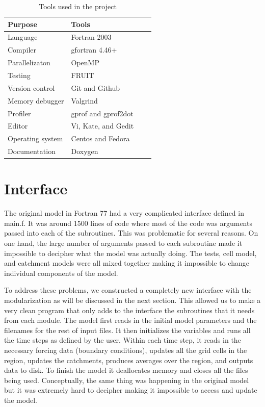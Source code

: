\documentclass[pdftex,12pt,a4paper]{article}
\begin{document}
\begin{table}[ht]
  \begin{center}
    \caption{Tools used in the project}
    \begin{tabular}{ | l | l | l | p{5cm} |}
    \hline
    Purpose & Tools \\ \hline
    Language & Fortran 2003 \\
    Compiler & gfortran 4.46+ \\
    Parallelizaton & OpenMP \\
    Testing & FRUIT \\ 
    Version control & Git and Github \\ 
    Memory debugger & Valgrind \\ 
    Profiler & gprof and gprof2dot\\ 
    Editor & Vi, Kate, and Gedit \\
    Operating system & Centos and Fedora \\
    Documentation & Doxygen \\ \hline
    \end{tabular}
  \end{center}
\end{table}

\section{Interface}
The original model in Fortran 77 had a very complicated interface defined in main.f. It was around 1500 lines of code where most of the code was arguments passed into each of the subroutines. This was problematic for several reasons. On one hand, the large number of arguments passed to each subroutine made it impossible to decipher what the model was actually doing. The tests, cell model, and catchment models were all mixed together making it impossible to change individual components of the model. 

To address these problems, we constructed a completely new interface with the modularization as will be discussed in the next section. This allowed us to make a very clean program that only adds to the interface the subroutines that it needs from each module. The model first reads in the initial model parameters and the filenames for the rest of input files. It then initializes the variables and runs all the time steps as defined by the user. Within each time step, it reads in the necessary forcing data (boundary conditions), updates all the grid cells in the region, updates the catchments, produces averages over the region, and outputs data to disk. To finish the model it deallocates memory and closes all the files being used. Conceptually, the same thing was happening in the original model but it was extremely hard to decipher making it impossible to access and update the model. 
\end{document}
